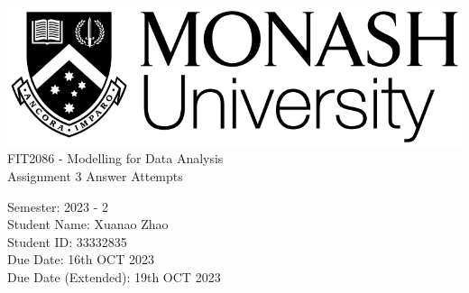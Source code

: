 \begin{titlepage}

  \includegraphics[width=0.25\linewidth]{monashlogo.png} \\
  
  
  \pstitle
  FIT2086 - Modelling for Data Analysis \\
  Assignment 3 Answer Attempts

  \vspace{2cm}
  
  \pspara
  Semester: 2023 - 2 \\
  Student Name: Xuanao Zhao \\
  Student ID: 33332835 \\
  Due Date: 16th OCT 2023 \\
  Due Date (Extended): 19th OCT 2023

  \vspace{5cm}


\end{titlepage}